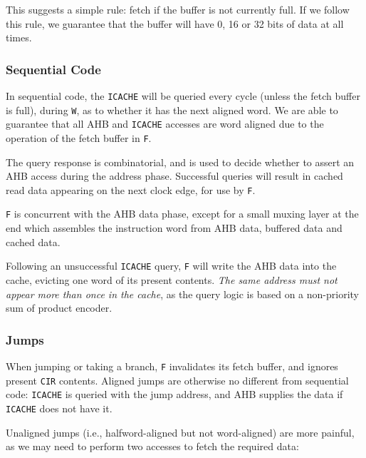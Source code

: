 \documentclass{article}
\begin{document}
This suggests a simple rule: fetch if the buffer is not currently full. If we follow this rule, we guarantee that the buffer will have 0, 16 or 32 bits of data at all times.

\subsubsection{Sequential Code}

In sequential code, the \texttt{ICACHE} will be queried every cycle (unless the fetch buffer is full), during \texttt{W}, as to whether it has the next aligned word. We are able to guarantee that all AHB and \texttt{ICACHE} accesses are word aligned due to the operation of the fetch buffer in \texttt{F}.

The query response is combinatorial, and is used to decide whether to assert an AHB access during the address phase. Successful queries will result in cached read data appearing on the next clock edge, for use by \texttt{F}.

\texttt{F} is concurrent with the AHB data phase, except for a small muxing layer at the end which assembles the instruction word from AHB data, buffered data and cached data.

Following an unsuccessful \texttt{ICACHE} query, \texttt{F} will write the AHB data into the cache, evicting one word of its present contents. \textit{The same address must not appear more than once in the cache}, as the query logic is based on a non-priority sum of product encoder.


\subsubsection{Jumps}
\label{section:jumps}

When jumping or taking a branch, \texttt{F} invalidates its fetch buffer, and ignores present \texttt{CIR} contents. Aligned jumps are otherwise no different from sequential code: \texttt{ICACHE} is queried with the jump address, and AHB supplies the data if \texttt{ICACHE} does not have it.

Unaligned jumps (i.e., halfword-aligned but not word-aligned) are more painful, as we may need to perform two accesses to fetch the required data:
\end{document}

